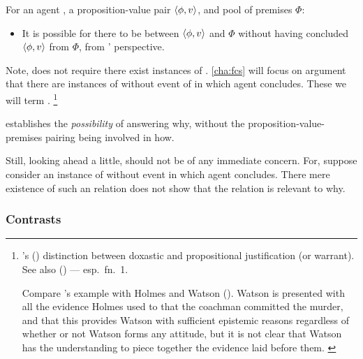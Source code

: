 \begin{note}
  \begin{idea}[\supportII{}]
    \label{idea:support:possible}
    For an agent \vAgent{}, a proposition-value pair \(\langle \phi, v \rangle\), and pool of premises \(\Phi\):

    \begin{itemize}
    \item
      It is possible for there to be \support{} between \(\langle \phi, v \rangle\) and \(\Phi\) without \vAgent{} having concluded \(\langle \phi, v \rangle\) from \(\Phi\), from \vAgent{}' perspective.
    \end{itemize}
    \vspace{-\baselineskip}
  \end{idea}

  Note, \supportII{} does not require there exist instances of \support{}.
  \autoref{cha:fcs} will focus on argument that there are instances of \support{} without event of in which agent concludes.
  These we will term .%
  \footnote{
    \citeauthor{Firth:1978vi}'s (\citeyear{Firth:1978vi}) distinction between doxastic and propositional justification (or warrant).
    See also \citeauthor{Silva:2020aa} (\citeyear{Silva:2020aa}) --- esp.\ fn.\ 1.

    {\color{red}
      Compare \citeauthor{Firth:1978vi}'s example with Holmes and Watson (\citeyear[218]{Firth:1978vi}).
      Watson is presented with all the evidence Holmes used to that the coachman committed the murder, and that this provides Watson with sufficient epistemic reasons regardless of whether or not Watson forms any attitude, but it is not clear that Watson has the understanding to piece together the evidence laid before them.
    }
  }

  \supportII{} establishes the \emph{possibility} of \support{} answering why, without the proposition-value-premises pairing being involved in how.

  Still, looking ahead a little, \supportII{} should not be of any immediate concern.
  For, suppose consider an instance of \support{} without event in which agent concludes.
  There mere existence of such an relation does not show that the relation is relevant to why.
\end{note}

\subsubsection{Contrasts}

